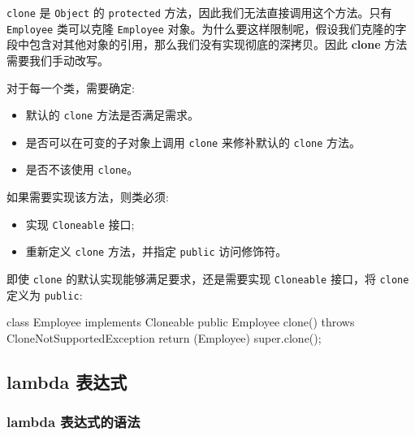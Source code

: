\texttt{clone} 是 \texttt{Object} 的 \texttt{protected} 方法，因此我们无法直接调用这个方法。只有 \texttt{Employee} 类可以克隆 \texttt{Employee} 对象。为什么要这样限制呢，假设我们克隆的字段中包含对其他对象的引用，那么我们没有实现彻底的深拷贝。因此 \textbf{clone} 方法需要我们手动改写。

对于每一个类，需要确定:
\begin{itemize}
    \item 默认的 \texttt{clone} 方法是否满足需求。
    \item 是否可以在可变的子对象上调用 \texttt{clone} 来修补默认的 \texttt{clone} 方法。
    \item 是否不该使用 \texttt{clone}。
\end{itemize}

如果需要实现该方法，则类必须:
\begin{itemize}
    \item 实现 \texttt{Cloneable} 接口;
    \item 重新定义 \texttt{clone} 方法，并指定 \texttt{public} 访问修饰符。
\end{itemize}

即使 \texttt{clone} 的默认实现能够满足要求，还是需要实现 \texttt{Cloneable} 接口，将 \texttt{clone} 定义为 \texttt{public}:

\begin{Java}
class Employee implements Cloneable {
    public Employee clone() throws CloneNotSupportedException{
        return (Employee) super.clone();
    }
}   
\end{Java}


\subsection{lambda 表达式}

\subsubsection{lambda 表达式的语法}

